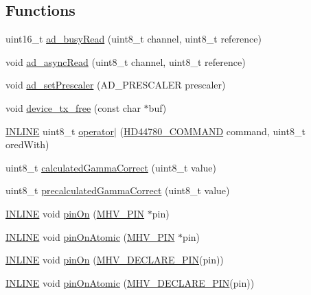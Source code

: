 \subsection*{Functions}
\begin{DoxyCompactItemize}
\item 
uint16\-\_\-t \hyperlink{namespacemhvlib_acbf48834607246664c3e43b46aef72ed}{ad\-\_\-busy\-Read} (uint8\-\_\-t channel, uint8\-\_\-t reference)
\item 
void \hyperlink{namespacemhvlib_a75c08e1b87e6fda3162ec346d997f3a6}{ad\-\_\-async\-Read} (uint8\-\_\-t channel, uint8\-\_\-t reference)
\item 
void \hyperlink{namespacemhvlib_a4eb833af8b3f15f12df04471ff760d7d}{ad\-\_\-set\-Prescaler} (A\-D\-\_\-\-P\-R\-E\-S\-C\-A\-L\-E\-R prescaler)
\item 
void \hyperlink{namespacemhvlib_acea09a73a5e1915232dff534924ad0cd}{device\-\_\-tx\-\_\-free} (const char $\ast$buf)
\item 
\hyperlink{io_8h_a2eb6f9e0395b47b8d5e3eeae4fe0c116}{I\-N\-L\-I\-N\-E} uint8\-\_\-t \hyperlink{namespacemhvlib_acd3dc66b8c71f47eba2421fd782eb8c9}{operator$|$} (\hyperlink{namespacemhvlib_a810a3cc703298cdd5d00c913cb1bfec9}{H\-D44780\-\_\-\-C\-O\-M\-M\-A\-N\-D} command, uint8\-\_\-t ored\-With)
\item 
uint8\-\_\-t \hyperlink{namespacemhvlib_a485ac23527475b68771fb958a9b45743}{calculated\-Gamma\-Correct} (uint8\-\_\-t value)
\item 
uint8\-\_\-t \hyperlink{namespacemhvlib_a921f639e21a98214ed2b53561d98be7c}{precalculated\-Gamma\-Correct} (uint8\-\_\-t value)
\item 
\hyperlink{io_8h_a2eb6f9e0395b47b8d5e3eeae4fe0c116}{I\-N\-L\-I\-N\-E} void \hyperlink{namespacemhvlib_a0838594e2fe439340e24ae93ef27c9a8}{pin\-On} (\hyperlink{namespacemhvlib_a3fc44352ee2826fe480452ba1acd5de7}{M\-H\-V\-\_\-\-P\-I\-N} $\ast$pin)
\item 
\hyperlink{io_8h_a2eb6f9e0395b47b8d5e3eeae4fe0c116}{I\-N\-L\-I\-N\-E} void \hyperlink{namespacemhvlib_ae0c14d064f421a207d51a3af6bf96596}{pin\-On\-Atomic} (\hyperlink{namespacemhvlib_a3fc44352ee2826fe480452ba1acd5de7}{M\-H\-V\-\_\-\-P\-I\-N} $\ast$pin)
\item 
\hyperlink{io_8h_a2eb6f9e0395b47b8d5e3eeae4fe0c116}{I\-N\-L\-I\-N\-E} void \hyperlink{namespacemhvlib_ad0dd0c27390bf9c2043e1c4e73254cd2}{pin\-On} (\hyperlink{io_8h_afb172d17be3890bb07e5ceec5a014b91}{M\-H\-V\-\_\-\-D\-E\-C\-L\-A\-R\-E\-\_\-\-P\-I\-N}(pin))
\item 
\hyperlink{io_8h_a2eb6f9e0395b47b8d5e3eeae4fe0c116}{I\-N\-L\-I\-N\-E} void \hyperlink{namespacemhvlib_a464565ac010eaa97b6fe6048daf23a63}{pin\-On\-Atomic} (\hyperlink{io_8h_afb172d17be3890bb07e5ceec5a014b91}{M\-H\-V\-\_\-\-D\-E\-C\-L\-A\-R\-E\-\_\-\-P\-I\-N}(pin))

\end{DoxyCompactItemize}
